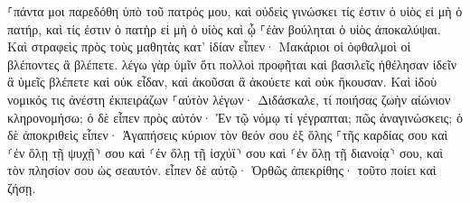\documentclass{openreader}
\begin{document}
⸀πάντα μοι παρεδόθη ὑπὸ τοῦ πατρός μου, καὶ οὐδεὶς γινώσκει τίς ἐστιν ὁ υἱὸς εἰ μὴ ὁ πατήρ, καὶ τίς ἐστιν ὁ πατὴρ εἰ μὴ ὁ υἱὸς καὶ ᾧ ⸀ἐὰν βούληται ὁ υἱὸς ἀποκαλύψαι. 
Καὶ στραφεὶς πρὸς τοὺς μαθητὰς κατ’ ἰδίαν εἶπεν· Μακάριοι οἱ ὀφθαλμοὶ οἱ βλέποντες ἃ βλέπετε. 
λέγω γὰρ ὑμῖν ὅτι πολλοὶ προφῆται καὶ βασιλεῖς ἠθέλησαν ἰδεῖν ἃ ὑμεῖς βλέπετε καὶ οὐκ εἶδαν, καὶ ἀκοῦσαι ἃ ἀκούετε καὶ οὐκ ἤκουσαν. 
Καὶ ἰδοὺ νομικός τις ἀνέστη ἐκπειράζων ⸀αὐτὸν λέγων· Διδάσκαλε, τί ποιήσας ζωὴν αἰώνιον κληρονομήσω; 
ὁ δὲ εἶπεν πρὸς αὐτόν· Ἐν τῷ νόμῳ τί γέγραπται; πῶς ἀναγινώσκεις; 
ὁ δὲ ἀποκριθεὶς εἶπεν· Ἀγαπήσεις κύριον τὸν θεόν σου ἐξ ὅλης ⸀τῆς καρδίας σου καὶ ⸂ἐν ὅλῃ τῇ ψυχῇ⸃ σου καὶ ⸂ἐν ὅλῃ τῇ ἰσχύϊ⸃ σου καὶ ⸂ἐν ὅλῃ τῇ διανοίᾳ⸃ σου, καὶ τὸν πλησίον σου ὡς σεαυτόν. 
εἶπεν δὲ αὐτῷ· Ὀρθῶς ἀπεκρίθης· τοῦτο ποίει καὶ ζήσῃ. 
\end{document}
